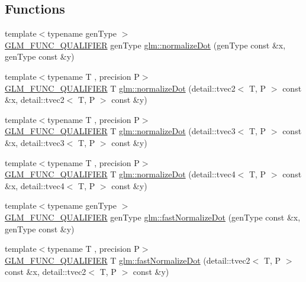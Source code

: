 \subsection*{Functions}
\begin{DoxyCompactItemize}
\item 
{\footnotesize template$<$typename gen\+Type $>$ }\\\hyperlink{setup_8hpp_a33fdea6f91c5f834105f7415e2a64407}{G\+L\+M\+\_\+\+F\+U\+N\+C\+\_\+\+Q\+U\+A\+L\+I\+F\+I\+ER} gen\+Type \hyperlink{group__gtx__normalize__dot_ga13b81f0882c1811cb6c99a5864b9c152}{glm\+::normalize\+Dot} (gen\+Type const \&x, gen\+Type const \&y)
\item 
{\footnotesize template$<$typename T , precision P$>$ }\\\hyperlink{setup_8hpp_a33fdea6f91c5f834105f7415e2a64407}{G\+L\+M\+\_\+\+F\+U\+N\+C\+\_\+\+Q\+U\+A\+L\+I\+F\+I\+ER} T \hyperlink{namespaceglm_a57fabe89311600d86b489bf9d2ebdd67}{glm\+::normalize\+Dot} (detail\+::tvec2$<$ T, P $>$ const \&x, detail\+::tvec2$<$ T, P $>$ const \&y)
\item 
{\footnotesize template$<$typename T , precision P$>$ }\\\hyperlink{setup_8hpp_a33fdea6f91c5f834105f7415e2a64407}{G\+L\+M\+\_\+\+F\+U\+N\+C\+\_\+\+Q\+U\+A\+L\+I\+F\+I\+ER} T \hyperlink{namespaceglm_ace07e8c0834217ad8e5e025247f17df5}{glm\+::normalize\+Dot} (detail\+::tvec3$<$ T, P $>$ const \&x, detail\+::tvec3$<$ T, P $>$ const \&y)
\item 
{\footnotesize template$<$typename T , precision P$>$ }\\\hyperlink{setup_8hpp_a33fdea6f91c5f834105f7415e2a64407}{G\+L\+M\+\_\+\+F\+U\+N\+C\+\_\+\+Q\+U\+A\+L\+I\+F\+I\+ER} T \hyperlink{namespaceglm_a763d17f02acc109bf9818eb8048ce699}{glm\+::normalize\+Dot} (detail\+::tvec4$<$ T, P $>$ const \&x, detail\+::tvec4$<$ T, P $>$ const \&y)
\item 
{\footnotesize template$<$typename gen\+Type $>$ }\\\hyperlink{setup_8hpp_a33fdea6f91c5f834105f7415e2a64407}{G\+L\+M\+\_\+\+F\+U\+N\+C\+\_\+\+Q\+U\+A\+L\+I\+F\+I\+ER} gen\+Type \hyperlink{group__gtx__normalize__dot_gaeb26ec35a51c30dbd0d91f9da45eeafe}{glm\+::fast\+Normalize\+Dot} (gen\+Type const \&x, gen\+Type const \&y)
\item 
{\footnotesize template$<$typename T , precision P$>$ }\\\hyperlink{setup_8hpp_a33fdea6f91c5f834105f7415e2a64407}{G\+L\+M\+\_\+\+F\+U\+N\+C\+\_\+\+Q\+U\+A\+L\+I\+F\+I\+ER} T \hyperlink{namespaceglm_ab3e920221404490d3c2bf00ba18ed132}{glm\+::fast\+Normalize\+Dot} (detail\+::tvec2$<$ T, P $>$ const \&x, detail\+::tvec2$<$ T, P $>$ const \&y)

\end{DoxyCompactItemize}
